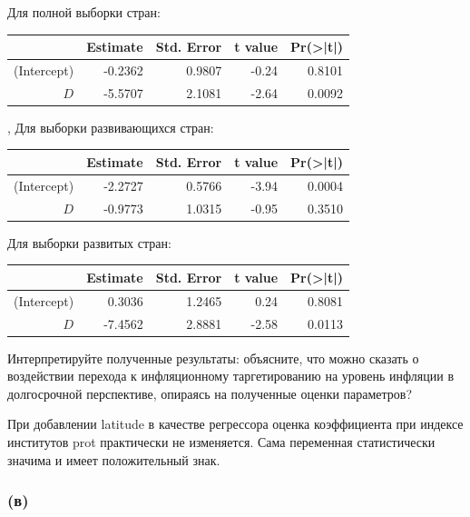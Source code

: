 \documentclass[a4paper,12pt]{article} %
\begin{document}
Для полной выборки стран:

\begin{table}[h!]
	\centering
	\begin{tabular}{rrrrr}
		\hline
		& Estimate & Std. Error & t value & Pr(>|t|) \\ 
		\hline
		(Intercept) & -0.2362 & 0.9807 & -0.24 & 0.8101 \\ 
		$ D $ & -5.5707 & 2.1081 & -2.64 & 0.0092 \\ 
		\hline
	\end{tabular}
\end{table}

,
Для выборки развивающихся стран:

\begin{table}[h!]
	\centering
	\begin{tabular}{rrrrr}
		\hline
		& Estimate & Std. Error & t value & Pr(>|t|) \\ 
		\hline
		(Intercept) & -2.2727 & 0.5766 & -3.94 & 0.0004 \\ 
		$ D $ & -0.9773 & 1.0315 & -0.95 & 0.3510 \\ 
		\hline
		\end{tabular}
		\end{table}

Для выборки развитых стран:

\begin{table}[h!]
	\centering
	\begin{tabular}{rrrrr}
		\hline
		& Estimate & Std. Error & t value & Pr(>|t|) \\ 
		\hline
		(Intercept) & 0.3036 & 1.2465 & 0.24 & 0.8081 \\ 
		$ D $ & -7.4562 & 2.8881 & -2.58 & 0.0113 \\ 
		\hline
		\end{tabular}
		\end{table}

Интерпретируйте полученные результаты: объясните, что можно
сказать о воздействии перехода к инфляционному таргетированию на
уровень инфляции в долгосрочной перспективе, опираясь на полученные
оценки параметров?

При добавлении latitude в качестве регрессора  
оценка коэффициента при индексе институтов prot практически не изменяется. Сама переменная статистически значима и имеет положительный знак.



\subsubsection*{(в)}	
\end{document}

